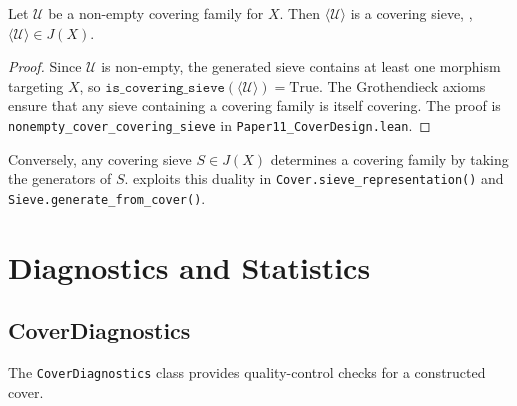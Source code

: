 \documentclass[11pt]{article}
\begin{document}
\begin{proposition}
\label{prop:sieve}
Let $\mathcal{U}$ be a non-empty covering family for $X$.
Then $\langle \mathcal{U} \rangle$ is a covering sieve, \ie,
$\langle \mathcal{U} \rangle \in J(X)$.
\end{proposition}

\begin{proof}
Since $\mathcal{U}$ is non-empty, the generated sieve contains at
least one morphism targeting $X$, so
$\texttt{is\_covering\_sieve}(\langle \mathcal{U} \rangle) = \mathrm{True}$.
The Grothendieck axioms ensure that any sieve containing a covering
family is itself covering.
The \LEAN{} proof is \texttt{nonempty\_cover\_covering\_sieve}
in \texttt{Paper11\_CoverDesign.lean}.
\end{proof}

Conversely, any covering sieve $S \in J(X)$ determines a covering
family by taking the generators of $S$.
\JuGeo{} exploits this duality in \texttt{Cover.sieve\_representation()}
and \texttt{Sieve.generate\_from\_cover()}.

\section{Diagnostics and Statistics}\label{sec:diagnostics}

\subsection{CoverDiagnostics}

The \texttt{CoverDiagnostics} class provides quality-control checks
for a constructed cover.
\end{document}
